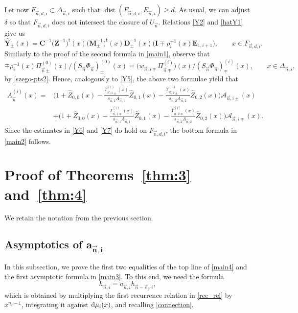 \documentclass[pdftex]{sigma}
\numberwithin{equation}{section}
\newcommand{\dist}{\operatorname{dist}}
\newcommand{\n}{{\vec n}}
\begin{document}
Let now $ F_{\n,d,i} \subset \Delta_{\n,i} $ such that $ \dist(F_{\n,d,i}, E_{\n,i})\geq d $. As usual, we can adjust $ \delta $ so that $ F_{\n,d,i} $ does not intersect the closure of $ U_\n $. Relations \eqref{Y2} and \eqref{hatY1} give us
\[
\widehat{\boldsymbol Y}_{\pm}(x) = \boldsymbol C^{-1}\bigl(\boldsymbol Z^{-1}\bigr)^{\mathrm t}(x)\bigl(\boldsymbol M_{\pm}^{-1}\bigr)^\mathrm{t}(x)\boldsymbol D_{\pm}^{-1}(x)\bigl(\boldsymbol I\mp \rho_i^{-1}(x)\boldsymbol E_{1,i+1}\bigr), \qquad x\in F_{\n,d,i}.
\]
Similarly to the proof of the second formula in \eqref{main1}, observe that
\[
\mp\rho_i^{-1}(x)\Pi_{\n\pm}^{(0)}(x)/(S_\n\Phi_\n)_\pm^{(0)}(x) = \bigl(w_{\n,i\mp}\Pi_{\n\mp}^{(i)}\bigr)(x)/(S_\n\Phi_\n)_\mp^{(i)}(x), \qquad x\in\Delta_{\n,i},
\]
by \eqref{szego-pts2}. Hence, analogously to \eqref{Y5}, the above two formulae yield that
\begin{align*}
A_\n^{(i)}(x) ={}& \Bigg(1 + \widehat Z_{0,0}(x) - \frac{\Upsilon_{\n,1\pm}^{(i)}(x)}{s_{\n,1}A_{\n,1}} \widehat Z_{0,1}(x) - \frac{\Upsilon_{\n,2\pm}^{(i)}(x)}{s_{\n,2}A_{\n,2}}\widehat Z_{0,2}(x) \Bigg) \mathcal A_{\n,i\pm}(x) \\
& + \Bigg(1 + \widehat Z_{0,0}(x) - \frac{\Upsilon_{\n,1\mp}^{(i)}(x)}{s_{\n,1}A_{\n,1}} \widehat Z_{0,1}(x) - \frac{\Upsilon_{\n,2\mp}^{(i)}(x)}{s_{\n,2}A_{\n,2}} \widehat Z_{0,2}(x) \Bigg) \mathcal A_{\n,i\mp}(x).
\end{align*}
Since the estimates in \eqref{Y6} and \eqref{Y7} do hold on $ F_{\n,d,i} $, the bottom formula in \eqref{main2} follows.


\section[Proof of Theorems 1.10 and 1.11]{Proof of Theorems~\ref{thm:3} and~\ref{thm:4}}


We retain the notation from the previous section.

\subsection[Asymptotics of a\_n,i]{Asymptotics of $\boldsymbol{a_{\n,i} }$}

In this subsection, we prove the first two equalities of the top line of \eqref{main4} and the first asymptotic formula in \eqref{main3}. To this end, we need the formula
\begin{equation}
\label{9.1.1}
h_{\n,i} = a_{\n,i} h_{\n-\vec e_i,i},
\end{equation}
which is obtained by multiplying the first recurrence relation in \eqref{rec_rel} by $ x^{n_i-1} $, integrating it against $ {\rm d}\mu_i(x) $, and recalling \eqref{connection}.
\end{document}
